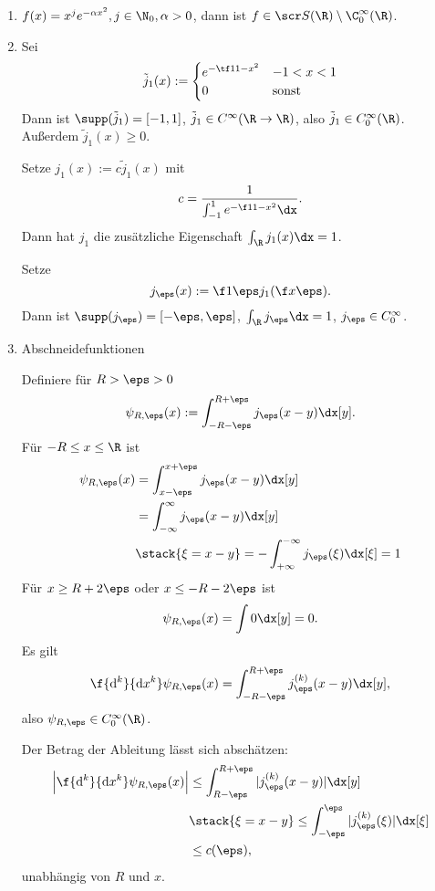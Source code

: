 \begin{ex} \label{4.2}
	\begin{enumerate}[1)]
		\item
			$f(x) = x^j e^{-\alpha x^2}, j \in \N_0, \alpha > 0$, dann ist $f \in \scr S(\R) \setminus \C_0^\infty (\R)$.
		\item
			Sei
			\[
				\tilde j_1(x) := \begin{cases}
					e^{-\tf 1{1-x^2}} & -1 < x < 1 \\
					0 & \text{sonst}
				\end{cases}
			\]
			Dann ist $\supp(\tilde j_1) = [-1,1]$, $\tilde j_1 \in C^\infty(\R \to \R)$, also $\tilde j_1 \in C_0^\infty(\R)$.
			Außerdem $\tilde j_1(x) \ge 0$.

			Setze $j_1(x) := c \tilde j_1(x)$ mit
			\[
				c = \dfrac 1{\int_{-1}^1 e^{- \f 1{1-x^2}} \dx}.
			\]
			Dann hat $j_1$ die zusätzliche Eigenschaft $\int_{\R} j_1(x) \dx = 1$.

			Setze
			\[
				j_\eps(x) := \f 1\eps j_1(\f x\eps).
			\]
			Dann ist $\supp(j_\eps) = [-\eps, \eps]$, $\int_\R j_\eps \dx = 1$, $j_\eps \in C_0^\infty$.
		\item
			Abschneidefunktionen

			Definiere für $R > \eps > 0$
			\[
				\psi_{R, \eps}(x) := \int_{-R-\eps}^{R+ \eps} j_\eps(x-y) \dx[y].
			\]
			Für $-R \le x \le \R$ ist
			\begin{align*}
				\psi_{R, \eps}(x)
				&= \int_{x-\eps}^{x+\eps} j_\eps (x-y) \dx[y] \\
				&= \int_{-\infty}^\infty j_\eps(x-y) \dx[y] \\
				&\stack{\xi = x-y} = -\int_{+\infty}^{-\infty}  j_\eps (\xi) \dx[\xi] = 1
			\end{align*}
			Für $x \ge R + 2\eps$ oder $x \le - R - 2\eps$ ist
			\[
				\psi_{R,\eps}(x) = \int 0 \dx[y] = 0.
			\]
			Es gilt
			\[
				\f {\mathrm{d}^k}{\mathrm{d}x^k} \psi_{R,\eps}(x)
				= \int_{-R-\eps}^{R+\eps} j_\eps^{(k)} (x-y) \dx[y],
			\]
			also $\psi_{R,\eps} \in C_0^\infty (\R)$.

			Der Betrag der Ableitung lässt sich abschätzen:
			\begin{align*}
				\Big| \f {\mathrm{d}^k}{\mathrm{d}x^k} \psi_{R,\eps}(x) \Big|
				&\le \int_{R-\eps}^{R+\eps} |j_\eps^{(k)}(x-y)| \dx[y] \\
				&\stack{\xi = x-y}\le \int_{-\eps}^\eps |j_\eps^{(k)}(\xi)| \dx[\xi] \\
				&\le c(\eps),
			\end{align*}
			unabhängig von $R$ und $x$.
	\end{enumerate}
\end{ex}

